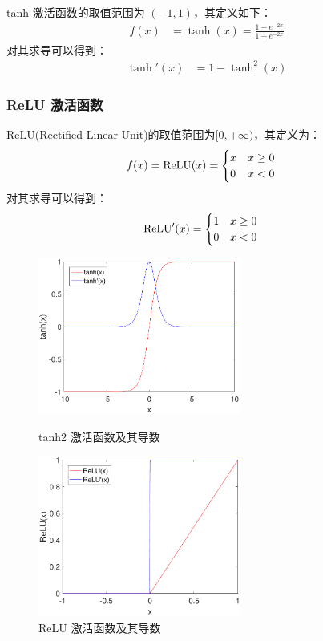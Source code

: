 tanh 激活函数的取值范围为 $(-1,1)$，其定义如下：
\begin{align}
f(x)&=\tanh(x)=\frac{1-e^{-2x}}{1+e^{-2x}}\;
\end{align}
对其求导可以得到：
\begin{align}
\tanh'(x)&=1-\tanh^2(x)\;
\end{align}


\subsubsection{ReLU 激活函数}

ReLU(Rectified Linear Unit)的取值范围为$[0,+\infty)$，其定义为：
\begin{align}
f(x)&={\rm ReLU}(x)=\begin{cases}
      x & x\geq 0 \\
      0& x<0
   \end{cases}\;
\end{align}
对其求导可以得到：
\begin{align}
{\rm ReLU}'(x)&=\begin{cases}
      1 & x\geq 0 \\
      0 & x<0
   \end{cases}\;
\end{align}


\begin{figure}[hbt]
	\centering
	\begin{minipage}{7cm}
		\includegraphics[width=6.67cm]{figures/networks/tanh2}
    \caption{tanh2 激活函数及其导数}
    \label{fig:tanh2}

	\end{minipage}
	\hspace{10pt}
	\begin{minipage}{7cm}
		\includegraphics[width=6.67cm]{figures/networks/ReLU}
    \caption{ReLU 激活函数及其导数}
    \label{fig:ReLU}

	\end{minipage}

\end{figure}

